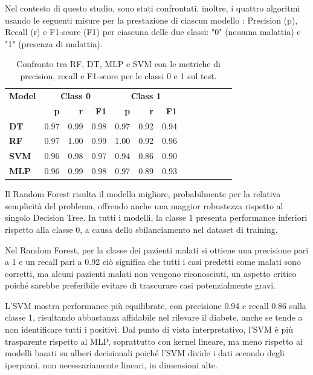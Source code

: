 \documentclass[conference]{IEEEtran}
\begin{document}
Nel contesto di questo studio, sono stati confrontati, inoltre, i quattro algoritmi usando le seguenti misure per la prestazione di ciascun modello : Precision (p), Recall (r) e F1-score (F1) per ciascuna delle due classi: "0" (nessuna malattia) e "1" (presenza di malattia).
\begin{table}[H]
\centering
\small
\begin{tabular}{l|rrr|rrr|rrr|rrr}
\toprule
\textbf{Model} & \multicolumn{3}{c|}{\textbf{Class 0}} & \multicolumn{3}{c|}{\textbf{Class 1}} \\
\cmidrule(r){2-4} \cmidrule(r){5-7}
 & \textbf{p} & \textbf{r} & \textbf{F1} & \textbf{p} & \textbf{r} & \textbf{F1} \\
\midrule
\textbf{DT} & 0.97 & 0.99 & 0.98 & 0.97 & 0.92 & 0.94 \\
\textbf{RF} & 0.97 & 1.00 & 0.99 & 1.00 & 0.92 & 0.96 \\
\textbf{SVM} & 0.96 & 0.98 & 0.97 & 0.94 & 0.86 & 0.90 \\
\textbf{MLP} & 0.96 & 0.99 & 0.98 & 0.97 & 0.89 & 0.93 \\
\bottomrule
\end{tabular}
\caption{Confronto tra RF, DT, MLP e SVM con le metriche di precision, recall e F1-score per le classi 0 e 1 sul test.}

\label{tab:classification_report_comparison_1}
\end{table}

Il Random Forest risulta il modello migliore, probabilmente per la relativa semplicità del problema, offrendo anche una maggior robustezza rispetto al singolo Decision Tree. In tutti i modelli, la classe 1 presenta performance inferiori rispetto alla classe 0, a causa dello sbilanciamento nel dataset di training.

Nel Random Forest, per la classe dei pazienti malati si ottiene una precisione pari a 1 e un recall pari a 0.92 ciò significa che tutti i casi predetti come malati sono corretti, ma alcuni pazienti malati non vengono riconosciuti, un aspetto critico poiché sarebbe preferibile evitare di trascurare casi potenzialmente gravi.

L’SVM mostra performance più equilibrate, con precisione 0.94 e recall 0.86 sulla classe 1, risultando abbastanza affidabile nel rilevare il diabete, anche se tende a non identificare tutti i positivi. Dal punto di vista interpretativo, l’SVM è più trasparente rispetto al MLP, soprattutto con kernel lineare, ma meno rispetto ai modelli basati su alberi decisionali poiché l'SVM divide i dati secondo degli iperpiani, non necessariamente lineari, in dimensioni alte.
\end{document}
